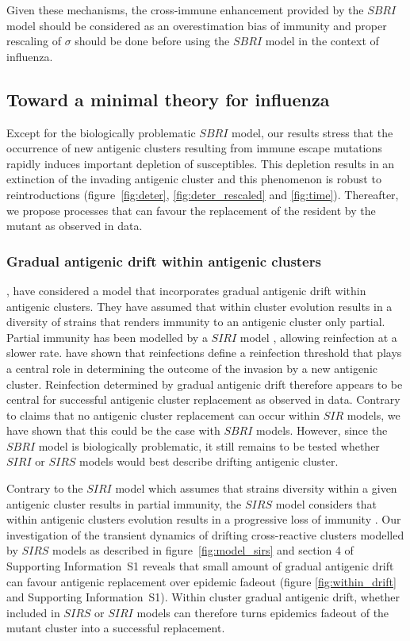 Given these mechanisms, the cross-immune enhancement provided by the
$SBRI$ model should be considered as an overestimation bias of
immunity and proper rescaling of $\sigma$ should be done before using
the $SBRI$ model in the context of influenza.

\subsection{Toward a minimal theory for influenza}

Except for the biologically problematic $SBRI$ model, our results
stress that the occurrence of new antigenic clusters resulting from
immune escape mutations rapidly induces important depletion of
susceptibles. This depletion results in an extinction of the invading
antigenic cluster and this phenomenon is robust to reintroductions
(figure~\ref{fig:deter}, \ref{fig:deter_rescaled} and
\ref{fig:time}). Thereafter, we propose processes that can
favour the replacement of the resident by the mutant as observed in
data.


\subsubsection{Gradual antigenic drift within antigenic clusters}

\citet{Goekaydin2007}, have considered a model that incorporates
gradual antigenic drift within antigenic clusters. They have assumed
that within cluster evolution results in a diversity of strains that
renders immunity to an antigenic cluster only partial. Partial
immunity has been modelled by a $SIRI$ model \citet{Gomes2004a},
allowing reinfection at a slower rate. \citet{Goekaydin2007} have
shown that reinfections define a reinfection threshold
\citet{Gomes2004a, Gomes2005} that plays a central role in determining
the outcome of the invasion by a new antigenic cluster. Reinfection
determined by gradual antigenic drift therefore appears to be central
for successful antigenic cluster replacement as observed in data.
Contrary to \citet{Goekaydin2007} claims that no antigenic cluster
replacement can occur within $SIR$ models, we have shown that this
could be the case with $SBRI$ models. However, since the $SBRI$ model
is biologically problematic, it still remains to be tested whether
$SIRI$ or $SIRS$ models would best describe drifting antigenic
cluster.

Contrary to the $SIRI$ model which assumes that strains diversity
within a given antigenic cluster results in partial immunity, the
$SIRS$ model considers that within antigenic clusters evolution
results in a progressive loss of immunity \citep{Pease1987}. Our
investigation of the transient dynamics of drifting cross-reactive
clusters modelled by $SIRS$ models as described in
figure~\ref{fig:model_sirs} and section 4 of Supporting Information~S1
reveals that small amount of gradual antigenic drift can favour
antigenic replacement over epidemic fadeout (figure
\ref{fig:within_drift} and Supporting Information~S1). Within cluster
gradual antigenic drift, whether included in $SIRS$ or $SIRI$ models
can therefore turns epidemics fadeout of the mutant cluster into a
successful replacement.

